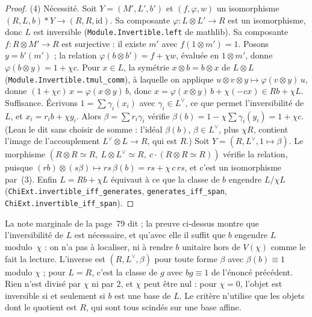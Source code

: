\begin{proof}
(4) Nécessité. Soit $Y = (M', L', b')$ et $(f, \varphi, w)$ un isomorphisme $(R, L, b) * Y \to (R, R, \mathrm{id})$. Sa composante $\varphi : L \otimes L' \to R$ est un isomorphisme, donc $L$ est inversible (\texttt{Module.\allowbreak{}Invertible.\allowbreak{}left} de mathlib). Sa composante $f : R \otimes M' \to R$ est surjective : il existe $m'$ avec $f(1 \otimes m') = 1$. Posons $y = b'(m')$ ; la relation $\varphi(b \otimes b') = f + \chi w$, évaluée en $1 \otimes m'$, donne $\varphi(b \otimes y) = 1 + \chi c$. Pour $x \in L$, la symétrie $x \otimes b = b \otimes x$ de $L \otimes L$ (\texttt{Module.\allowbreak{}Invertible.\allowbreak{}tmul\_comm}), à laquelle on applique $u \otimes v \otimes y \mapsto \varphi(v \otimes y)\,u$, donne $(1 + \chi c)\,x = \varphi(x \otimes y)\,b$, donc $x = \varphi(x \otimes y)\,b + \chi(-cx) \in Rb + \chi L$. Suffisance. Écrivons $1 = \sum \gamma_i(x_i)$ avec $\gamma_i \in L^\vee$, ce que permet l'inversibilité de $L$, et $x_i = r_ib + \chi y_i$. Alors $\beta = \sum r_i\gamma_i$ vérifie $\beta(b) = 1 - \chi\sum\gamma_i(y_i) = 1 + \chi c$. (Lean le dit sans choisir de somme : l'idéal $\beta(b)$, $\beta \in L^\vee$, plus $\chi R$, contient l'image de l'accouplement $L^\vee \otimes L \to R$, qui est $R$.) Soit $Y = (R, L^\vee, 1 \mapsto \beta)$. Le morphisme $(R \otimes R \simeq R,\ L \otimes L^\vee \simeq R,\ c \cdot (R \otimes R \simeq R))$ vérifie la relation, puisque $(rb) \otimes (s\beta) \mapsto rs\,\beta(b) = rs + \chi\,c\,rs$, et c'est un isomorphisme par~(3). Enfin $L = Rb + \chi L$ équivaut à ce que la classe de $b$ engendre $L/\chi L$ (\texttt{ChiExt.\allowbreak{}invertible\_iff\_generates}, \texttt{generates\_iff\_span}, \texttt{ChiExt.\allowbreak{}invertible\_iff\_span}).
\end{proof}

\begin{remarque}
La note marginale de la page~79 dit  ; la preuve ci-dessus montre que l'inversibilité de $L$ est nécessaire, et qu'avec elle il suffit que $b$ engendre $L$ modulo~$\chi$ : on n'a pas à localiser, ni à rendre $b$ unitaire hors de $V(\chi)$ comme le fait la lecture. L'inverse est $(R, L^\vee, \beta)$ pour toute forme $\beta$ avec $\beta(b) \equiv 1$ modulo $\chi$ ; pour $L = R$, c'est la classe de $g$ avec $bg \equiv 1$ de l'énoncé précédent. Rien n'est divisé par $\chi$ ni par $2$, et $\chi$ peut être nul : pour $\chi = 0$, l'objet est inversible si et seulement si $b$ est une base de $L$. Le critère n'utilise que les objets dont le quotient est $R$, qui sont tous scindés sur une base affine.
\end{remarque}


